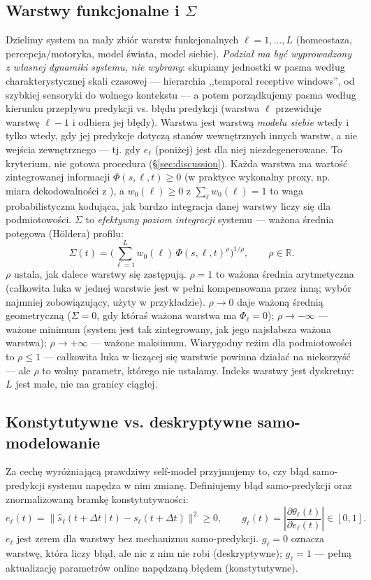 \documentclass[11pt]{article}
\begin{document}
\subsection{Warstwy funkcjonalne i $\Sigma$}
Dzielimy system na mały zbiór warstw funkcjonalnych $\ell=1,\dots,L$ (homeostaza, percepcja/motoryka, model świata, model siebie). \emph{Podział ma być wyprowadzony z własnej dynamiki systemu, nie wybrany}: skupiamy jednostki w pasma według charakterystycznej skali czasowej --- hierarchia ,,temporal receptive windows'', od szybkiej sensoryki do wolnego kontekstu \cite{hasson2008,kiebel2008} --- a potem porządkujemy pasma według kierunku przepływu predykcji vs. błędu predykcji (warstwa $\ell$ przewiduje warstwę $\ell-1$ i odbiera jej błędy). Warstwa jest warstwą \emph{modelu siebie} wtedy i tylko wtedy, gdy jej predykcje dotyczą stanów wewnętrznych innych warstw, a nie wejścia zewnętrznego --- tj. gdy $e_\ell$ (poniżej) jest dla niej niezdegenerowane. To kryterium, nie gotowa procedura (\S\ref{sec:discussion}). Każda warstwa ma wartość zintegrowanej informacji $\Phi(s,\ell,t)\ge0$ (w praktyce wykonalny proxy, np. miara dekodowalności z \cite{oizumi2016}), a $w_0(\ell)\ge0$ z $\sum_\ell w_0(\ell)=1$ to waga probabilistyczna kodująca, jak bardzo integracja danej warstwy liczy się dla podmiotowości. $\Sigma$ to \emph{efektywny poziom integracji} systemu --- ważona średnia potęgowa (H\"oldera) profilu:
\[
\Sigma(t) = \Big(\textstyle\sum_{\ell=1}^{L} w_0(\ell)\,\Phi(s,\ell,t)^{\rho}\Big)^{1/\rho}, \qquad \rho\in\mathbb R.
\]
$\rho$ ustala, jak dalece warstwy się zastępują. $\rho=1$ to ważona średnia arytmetyczna (całkowita luka w jednej warstwie jest w pełni kompensowana przez inną; wybór najmniej zobowiązujący, użyty w przykładzie). $\rho\to0$ daje ważoną średnią geometryczną ($\Sigma=0$, gdy któraś ważona warstwa ma $\Phi_\ell=0$); $\rho\to-\infty$ --- ważone minimum (system jest tak zintegrowany, jak jego najsłabsza ważona warstwa); $\rho\to+\infty$ --- ważone maksimum. Wiarygodny reżim dla podmiotowości to $\rho\le1$ --- całkowita luka w liczącej się warstwie powinna działać na niekorzyść --- ale $\rho$ to wolny parametr, którego nie ustalamy. Indeks warstwy jest dyskretny: $L$ jest małe, nie ma granicy ciągłej.

\subsection{Konstytutywne vs. deskryptywne samo-modelowanie}
Za cechę wyróżniającą prawdziwy self-model przyjmujemy to, czy błąd samo-predykcji systemu napędza w nim zmianę. Definiujemy błąd samo-predykcji oraz znormalizowaną bramkę konstytutywności:
\[
e_\ell(t) = \big\|\hat s_\ell(t+\Delta t\mid t) - s_\ell(t+\Delta t)\big\|^2 \ge 0, \qquad
g_\ell(t) = \left|\frac{\partial \theta_\ell(t)}{\partial e_\ell(t)}\right| \in [0,1].
\]
$e_\ell$ jest zerem dla warstwy bez mechanizmu samo-predykcji. $g_\ell=0$ oznacza warstwę, która liczy błąd, ale nic z nim nie robi (deskryptywne); $g_\ell=1$ --- pełną aktualizację parametrów online napędzaną błędem (konstytutywne).
\end{document}
